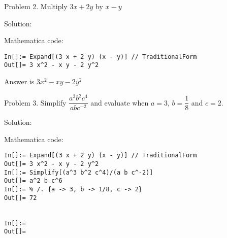 \documentclass{article}
\begin{document}
Problem 2. Multiply $3x+2y$ by $x-y$

Solution:

Mathematica code:
\begin{verbatim}
In[]:= Expand[(3 x + 2 y) (x - y)] // TraditionalForm
Out[]= 3 x^2 - x y - 2 y^2
\end{verbatim}

Answer is $3x^{2}-xy-2y^{2}$

\bigskip 

Problem 3. Simplify $\dfrac{a^{3}b^{2}c^{4}}{abc^{-2}}$ and evaluate when $%
a=3$, $b=\dfrac{1}{8}$ and $c=2$.

Solution:

Mathematica code:
\begin{verbatim}
In[]:= Expand[(3 x + 2 y) (x - y)] // TraditionalForm
Out[]= 3 x^2 - x y - 2 y^2
In[]:= Simplify[(a^3 b^2 c^4)/(a b c^-2)]
Out[]= a^2 b c^6
In[]:= % /. {a -> 3, b -> 1/8, c -> 2}
Out[]= 72
 
 
In[]:= 
Out[]= 
\end{verbatim}
\end{document}
